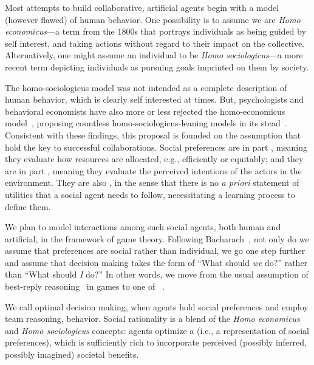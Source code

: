 Most attempts to build collaborative, artificial agents begin with a
model (however flawed) of human behavior.
%
One possibility is to assume we are \emph{Homo economicus}---a term
from the 1800s that portrays individuals as being guided by self interest,
and taking actions without regard to their impact on the collective.
Alternatively, one might assume an individual to be \emph{Homo
  sociologicus}---a more recent term depicting individuals as pursuing
goals imprinted on them by society.

The homo-sociologicus model was not intended as a complete description
of human behavior, which is clearly self interested at times.  But,
psychologists and behavioral economists have also more or less
rejected the homo-economicus model~\cite{Kahnemann, etc.}, proposing
countless homo-sociologicus-leaning models in its stead~\cite{ADD
  CITATIONS}.
%
Consistent with these findings, this proposal is founded on the
assumption that 
 hold the key to successful collaborations.
%
Social preferences are in part , meaning they
evaluate how resources are allocated, e.g., efficiently or equitably;
and they are in part , meaning they evaluate the
perceived intentions of the actors in the environment. They are also
, in the sense that there is no \emph{a priori} statement
of utilities that a social agent needs to follow, necessitating a learning
process to define them.

We plan to model interactions among such social agents, both human and
artificial, in the framework of game theory.  
%
Following Bacharach~\cite{2006}, not only do we assume that
preferences are social rather than individual, we go one step further
and assume that decision making takes the form of ``What should
\emph{we\/} do?'' rather than ``What should \emph{I\/} do?''  In other
words, we move from the usual assumption of best-reply
reasoning~\cite{Cournot} in games to one of ~\cite{TEAM REASONING: Bacharach 1999}.

We call optimal decision making, when agents hold
social preferences and employ team reasoning,  behavior.  Social rationality is a blend of the \emph{Homo
  economicus\/} and \emph{Homo sociologicus\/} concepts: agents
optimize a  (i.e., a representation of
social preferences), which is sufficiently rich to incorporate
perceived (possibly inferred, possibly imagined) societal benefits.


